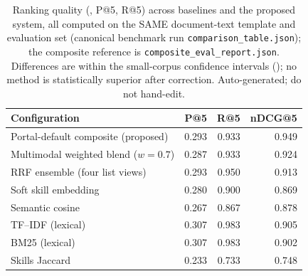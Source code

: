 \begin{table}[!t]
\centering
\caption{Ranking quality (\ndcg, P@5, R@5) across baselines and the proposed system, all computed on the SAME document-text template and evaluation set (canonical benchmark run \texttt{comparison\_table.json}); the composite reference is \texttt{composite\_eval\_report.json}. Differences are within the small-corpus confidence intervals (); no method is statistically superior after correction. Auto-generated; do not hand-edit.}
\label{tab:progression}
\begin{tabular}{@{}lrrr@{}}
\toprule
Configuration & P@5 & R@5 & nDCG@5 \\
\midrule
Portal-default composite (proposed) & 0.293 & 0.933 & 0.949 \\
\midrule
Multimodal weighted blend ($w{=}0.7$) & 0.287 & 0.933 & 0.924 \\
RRF ensemble (four list views) & 0.293 & 0.950 & 0.913 \\
Soft skill embedding & 0.280 & 0.900 & 0.869 \\
Semantic cosine & 0.267 & 0.867 & 0.878 \\
TF--IDF (lexical) & 0.307 & 0.983 & 0.905 \\
BM25 (lexical) & 0.307 & 0.983 & 0.902 \\
Skills Jaccard & 0.233 & 0.733 & 0.748 \\
\bottomrule
\end{tabular}
\end{table}
